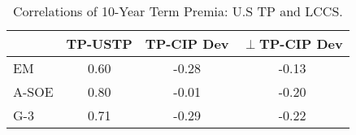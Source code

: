 \begin{tiny}\begin{table}\centering\begin{tabular}{l|ccc}\toprule & TP-USTP & TP-CIP Dev & $\perp$TP-CIP Dev \\\midrule EM & 0.60 & -0.28 & -0.13 \\A-SOE & 0.80 & -0.01 & -0.20 \\G-3 & 0.71 & -0.29 & -0.22 \\\bottomrule\end{tabular}\caption{Correlations of 10-Year Term Premia: U.S TP and LCCS.}\label{tab:temp_tp_corr10yr}\end{table}\end{tiny}